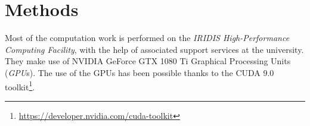 \chapter{Methods} \label{Chapter: Methods}






Most of the computation work is performed on the \textit{IRIDIS High-Performance Computing Facility}, with the help of associated support services at the university. They make use of NVIDIA\textregistered$ $ GeForce GTX 1080 Ti Graphical Processing Units (\textit{GPU}s). The use of the GPUs has been possible thanks to the CUDA 9.0 toolkit\footnote{\url{https://developer.nvidia.com/cuda-toolkit}}.

